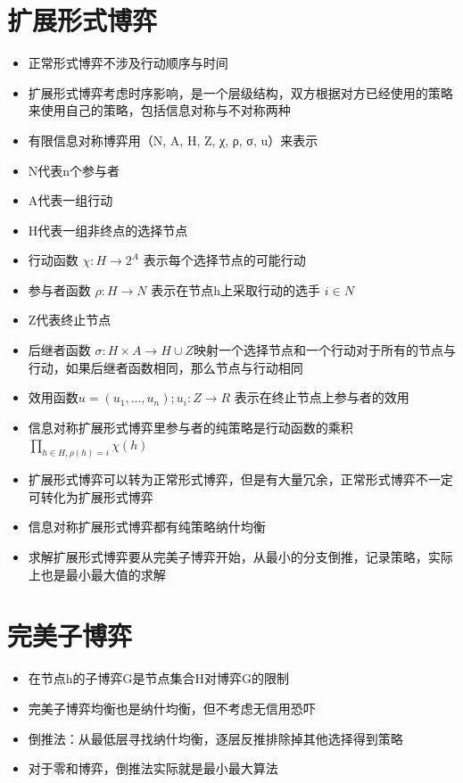 \documentclass[]{book}
\providecommand{\tightlist}{%
  \setlength{\itemsep}{0pt}\setlength{\parskip}{0pt}}
\begin{document}
\hypertarget{ux6269ux5c55ux5f62ux5f0fux535aux5f08}{%
\section{扩展形式博弈}\label{ux6269ux5c55ux5f62ux5f0fux535aux5f08}}

\begin{itemize}
\tightlist
\item
  正常形式博弈不涉及行动顺序与时间
\item
  扩展形式博弈考虑时序影响，是一个层级结构，双方根据对方已经使用的策略来使用自己的策略，包括信息对称与不对称两种
\item
  有限信息对称博弈用（N, A, H, Z, χ, ρ, σ, u）来表示
\item
  N代表n个参与者
\item
  A代表一组行动
\item
  H代表一组非终点的选择节点
\item
  行动函数 \(\chi:H \rightarrow 2^A\) 表示每个选择节点的可能行动
\item
  参与者函数 \(\rho:H \rightarrow N\) 表示在节点h上采取行动的选手 \(i\in N\)
\item
  Z代表终止节点
\item
  后继者函数 \(\sigma:H\times A\rightarrow H \cup Z\)映射一个选择节点和一个行动对于所有的节点与行动，如果后继者函数相同，那么节点与行动相同
\item
  效用函数\(u=(u_1,...,u_n);u_i:Z\rightarrow R\) 表示在终止节点上参与者的效用
\item
  信息对称扩展形式博弈里参与者的纯策略是行动函数的乘积\(\prod_{h\in H,\rho(h)=i}\chi(h)\)
\item
  扩展形式博弈可以转为正常形式博弈，但是有大量冗余，正常形式博弈不一定可转化为扩展形式博弈
\item
  信息对称扩展形式博弈都有纯策略纳什均衡
\item
  求解扩展形式博弈要从完美子博弈开始，从最小的分支倒推，记录策略，实际上也是最小最大值的求解
\end{itemize}

\hypertarget{ux5b8cux7f8eux5b50ux535aux5f08}{%
\section{完美子博弈}\label{ux5b8cux7f8eux5b50ux535aux5f08}}

\begin{itemize}
\tightlist
\item
  在节点h的子博弈G是节点集合H对博弈G的限制
\item
  完美子博弈均衡也是纳什均衡，但不考虑无信用恐吓
\item
  倒推法：从最低层寻找纳什均衡，逐层反推排除掉其他选择得到策略
\item
  对于零和博弈，倒推法实际就是最小最大算法
\end{itemize}
\end{document}
